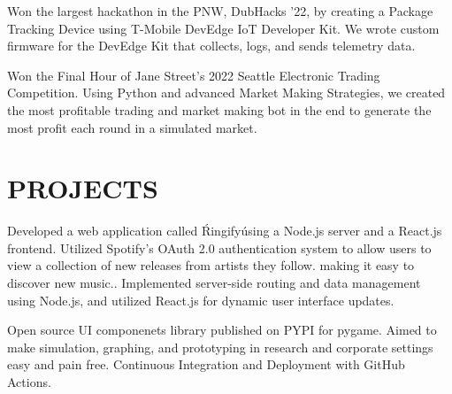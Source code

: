 \documentclass[]{main}
\begin{document}
\begin{minipage}[t]{0.66\textwidth}
Won the largest hackathon in the PNW, DubHacks '22, by creating a Package Tracking Device using T-Mobile DevEdge IoT Developer Kit. We wrote custom firmware for the DevEdge Kit that collects, logs, and sends telemetry data.
\sectionsep

Won the Final Hour of Jane Street's 2022 Seattle Electronic Trading Competition. Using Python and advanced Market Making Strategies, we created the most profitable trading and market making bot in the end to generate the most profit each round in a simulated market.
\sectionsep

\section{PROJECTS}
 
Developed a web application called \'Ringify\' using a Node.js server and a React.js frontend. Utilized Spotify's OAuth 2.0 authentication system to allow users to view a collection of new releases from artists they follow. making it easy to discover new music.. Implemented server-side routing and data management using Node.js, and utilized React.js for dynamic user interface updates.

\sectionsep

Open source UI componenets library published on PYPI for pygame. Aimed to make simulation, graphing, and prototyping in research and corporate settings easy and pain free. Continuous Integration and Deployment with GitHub Actions. 

\end{minipage} 
\end{document}
